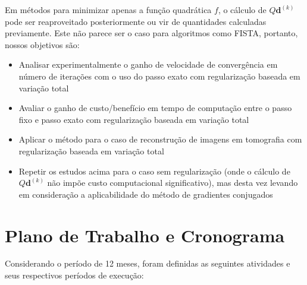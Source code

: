 \documentclass[12pt]{article}
\begin{document}
Em métodos para minimizar apenas a função quadrática $f$, o cálculo de $Q\bm d^{( k )}$ pode ser reaproveitado posteriormente ou vir de quantidades calculadas previamente. Este não parece ser o caso para algoritmos como FISTA, portanto, nossos objetivos são:
\begin{itemize}
    \item Analisar experimentalmente o ganho de velocidade de convergência em número de iterações com o uso do passo exato com regularização baseada em variação total
    \item Avaliar o ganho de custo/benefício em tempo de computação entre o passo fixo e passo exato com regularização baseada em variação total
    \item Aplicar o método para o caso de reconstrução de imagens em tomografia com regularização baseada em variação total
    \item Repetir os estudos acima para o caso sem regularização (onde o cálculo de $Q\bm d^{( k )}$ não impõe custo computacional significativo), mas desta vez levando em consideração a aplicabilidade do método de gradientes conjugados
\end{itemize}

\section{Plano de Trabalho e Cronograma}

Considerando o período de 12 meses, foram definidas as seguintes atividades e seus respectivos períodos de execução:
\end{document}
